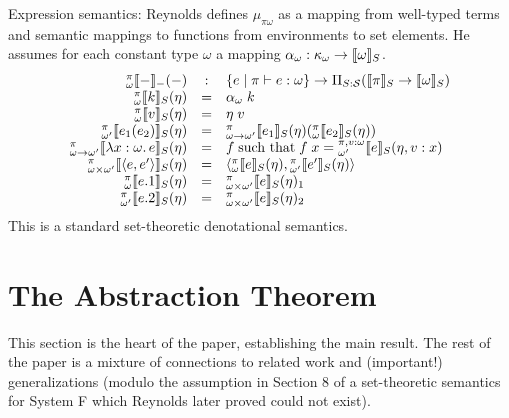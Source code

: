 \documentclass{article}
\begin{document}
Expression semantics: Reynolds defines $\mu_{\pi\omega}$ as a mapping from well-typed terms and
semantic mappings to functions from environments to set elements.  He assumes for each constant type
$\omega$ a mapping $\alpha_\omega : \kappa_\omega \rightarrow \llbracket \omega \rrbracket_{S}$.
\newcommand{\edenote}[5]{\ensuremath{{}^{#1}_{#2}\llbracket #3\rrbracket_{#4}(#5)}}
\[
    \begin{array}{rcl}
        \edenote{\pi}{\omega}{-}{-}{-} & : & \{ e \mid \pi\vdash e : \omega \} \rightarrow
        \Pi_{S:\mathcal{S}} (\denote{\pi}{S}\rightarrow\denote{\omega}{S})\\
        \edenote{\pi}{\omega}{k}{S}{\eta} & = & \alpha_\omega\;k\\
        \edenote{\pi}{\omega}{v}{S}{\eta} & = & \eta\;v\\
        \edenote{\pi}{\omega'}{e_1(e_2)}{S}{\eta} & = &
            \edenote{\pi}{\omega\rightarrow\omega'}{e_1}{S}{\eta}(\edenote{\pi}{\omega}{e_2}{S}{\eta})\\
        \edenote{\pi}{\omega\rightarrow\omega'}{\lambda x:\omega\ldotp e}{S}{\eta} & = & f \;\textrm{such that}\;
            f\;x=\edenote{\pi,v:\omega}{\omega'}{e}{S}{\eta,v:x}
        \\
        \edenote{\pi}{\omega\times\omega'}{\langle e,e' \rangle}{S}{\eta} & = & 
            \langle
            \edenote{\pi}{\omega}{e}{S}{\eta}
            ,
            \edenote{\pi}{\omega'}{e'}{S}{\eta}
            \rangle
        \\
        \edenote{\pi}{\omega}{e.1}{S}{\eta} & = & \edenote{\pi}{\omega\times\omega'}{e}{S}{\eta}_1\\
        \edenote{\pi}{\omega'}{e.2}{S}{\eta} & = & \edenote{\pi}{\omega\times\omega'}{e}{S}{\eta}_2\\
    \end{array}
\]
This is a standard set-theoretic denotational semantics.

\section*{The Abstraction Theorem}
This section is the heart of the paper, establishing the main result.  The rest of the paper is a
mixture of connections to related work and (important!) generalizations (modulo the assumption in
Section 8 of a set-theoretic semantics for System F which Reynolds later proved could not exist).
\end{document}

